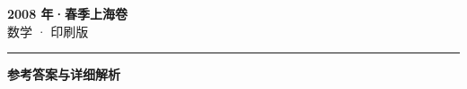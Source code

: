 \documentclass[zihao=5, a4paper]{ctexart}
\begin{document}
\begin{center}
  {\Large\bfseries 2008 年·春季上海卷}\\[4pt]
  {\large 数学 · 印刷版}
\end{center}
\medskip
{}

\par\bigskip\hrule\bigskip
{}
\begin{center}{\large\bfseries 参考答案与详细解析}\end{center}
\smallskip

\end{document}
